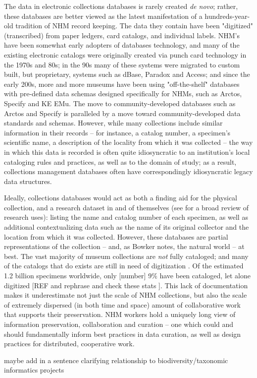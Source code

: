 The data in electronic collections databases is rarely created \textit{de novo}; rather, these databases are better viewed as the latest manifestation of a hundreds-year-old tradition of NHM record keeping. The data they contain have been "digitized" (transcribed) from paper ledgers, card catalogs, and individual labels. NHM's have been somewhat early adopters of databases technology, and many of the existing electronic catalogs were originally created via punch card technology in the 1970s and 80s; in the 90s many of these systems were migrated to custom built, but proprietary, systems such as dBase, Paradox and Access; and since the early 200s, more and more museums have been using "off-the-shelf" databases with pre-defined data schemas designed specifically for NHMs, such as Arctos, Specify and KE EMu. The move to community-developed databases such as Arctos and Specify is paralleled by a move toward community-developed data standards and schemas.  However, while many collections include similar information in their records – for instance, a catalog number, a specimen’s scientific name, a description of the locality from which it was collected – the way in which this data is recorded is often quite idiosyncratic to an institution’s local cataloging rules and practices, as well as to the domain of study; as a result, collections management databases often have correspondingly idiosyncratic legacy data structures.

Ideally, collections databases would act as both a finding aid for the physical collection, and a research dataset in and of themselves (see \cite{Chapman2005} for a broad review of research uses): listing the name and catalog number of each specimen, as well as additional contextualizing data such as the name of its original collector and the location from which it was collected. However, these databases are partial representations of the collection -- and, as Bowker notes, the natural world \cite{Bowker_2000} -- at best. The vast majority of museum collections are \textit{not} fully cataloged; and many of the catalogs that do exists are still in need of digitization \cite{Beaman_2012}. Of the estimated 1.2 billion specimens worldwide, only [number] 9\% have been cataloged, let alone digitized [REF and rephrase and check these stats \cite{Ari_o_2010}]. This lack of documentation makes it underestimate not just the scale of NHM collections, but also the scale of extremely dispersed (in both time and space) amount of collaborative work that supports their preservation. NHM workers hold a uniquely long view of information preservation, collaboration and curation -- one which could and should fundamentally inform best practices in data curation, as well as design practices for distributed, cooperative work.

maybe add in a sentence clarifying relationship to biodiversity/taxonomic informatics projects
